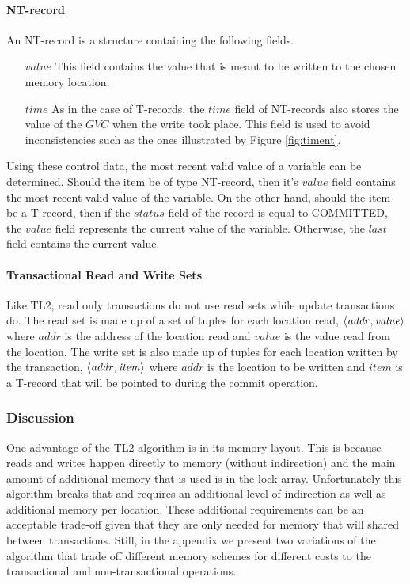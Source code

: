 \documentclass[11pt,letterpaper]{article}
\begin{document}
\paragraph{NT-record}
An NT-record is a structure containing the following fields.
\begin{itemize}
\vspace{-0.1cm}
\item[$\mathit{value}$]
This field contains the value that is meant to be written to the chosen 
memory location.
\vspace{-0.2cm}
\item[$\mathit{time}$]
As in the case of T-records, the $\mathit{time}$ field of NT-records 
also stores the value 
of the $\mathit{GVC}$ when the write took place. This field is 
used to avoid inconsistencies such as the ones illustrated by Figure 
\ref{fig:timent}. 
\end{itemize}

Using these control data, the most  recent valid value  of a variable  can be
determined.  Should the item be of type NT-record,
then it's $\mathit{value}$ field contains the most  
recent valid value  of the variable. On the other hand,  should the item
 be a  T-record, then if the $\mathit{status}$ field of
the record is equal to COMMITTED,  
the $\mathit{value}$ field represents the current value of the variable. Otherwise, the
$\mathit{last}$ field contains the current value.

\paragraph{Transactional Read and Write Sets}
Like TL2, read only transactions do not use read sets while update transactions do.
The read set is made up of a set of tuples for each location read, $\left \langle \mathit{addr, value} \right \rangle $
where $\mathit{addr}$ is the address of the location read and $\mathit{value}$ is the value
read from the location.
The write set is also made up of tuples for each location written by the transaction,
$\left \langle \mathit{addr, item} \right \rangle $ where $\mathit{addr}$ is the location to be written
and $\mathit{item}$ is a T-record that will be pointed to during the commit operation.

\subsubsection{Discussion}
One advantage of the TL2 algorithm is in its memory layout.
This is because reads and writes happen directly to memory (without indirection)
and the main amount of additional memory that is used is in the lock array.
Unfortunately this algorithm breaks that and requires an additional level of indirection
as well as additional memory per location.
These additional requirements can be an acceptable trade-off given that they are only
needed for memory that will shared between transactions.
Still, in the appendix we present two variations of the algorithm that trade
off different memory schemes for different costs to the transactional and
non-transactional operations.
\end{document}
